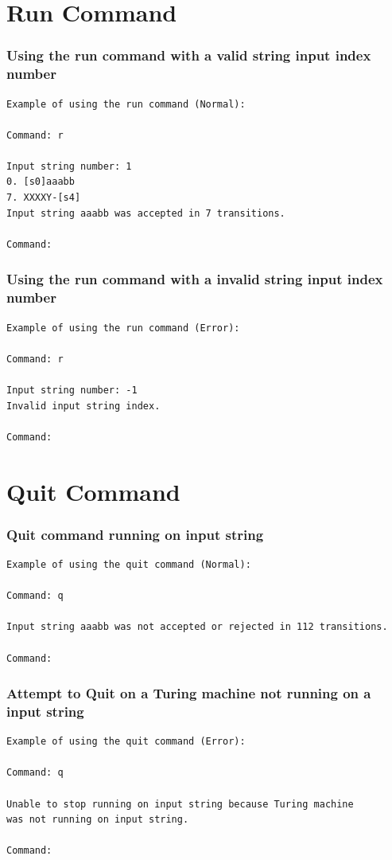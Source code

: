 \documentclass{report}
\begin{document}
     \section{Run Command}
\subsubsection{Using the run command with a valid string input index number}
     \begin{verbatim}
Example of using the run command (Normal):

Command: r

Input string number: 1
0. [s0]aaabb
7. XXXXY-[s4]
Input string aaabb was accepted in 7 transitions.

Command: 
\end{verbatim}

\subsubsection{Using the run command with a invalid string input index number}
\begin{verbatim}
Example of using the run command (Error):

Command: r

Input string number: -1
Invalid input string index.

Command: 
\end{verbatim}


     \section{Quit Command}
\subsubsection{Quit command running on input string}
     \begin{verbatim}
Example of using the quit command (Normal):

Command: q

Input string aaabb was not accepted or rejected in 112 transitions.

Command: 
\end{verbatim}

\subsubsection{Attempt to Quit on a Turing machine not running on a input string}
     \begin{verbatim}
Example of using the quit command (Error):

Command: q

Unable to stop running on input string because Turing machine 
was not running on input string.

Command: 
\end{verbatim}
\end{document}
